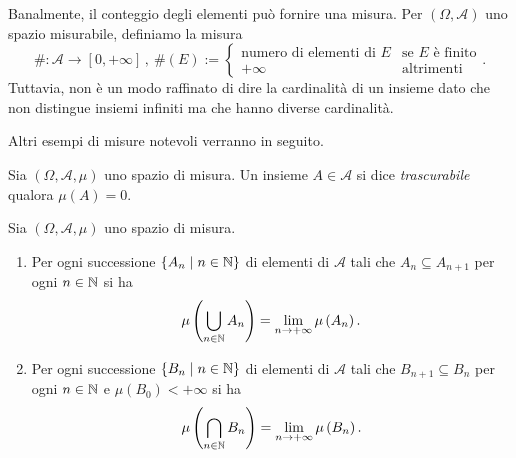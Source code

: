 \begin{esempio}
Banalmente, il conteggio degli elementi può fornire una misura. Per \((\Omega, \mathcal A)\) uno spazio misurabile, definiamo la misura
\[\# : \mathcal A \to [0, +\infty]\,, \ \#(E) := \begin{cases} \text{numero di elementi di } E & \text{se \(E\) è finito} \\ +\infty & \text{altrimenti} \end{cases} .\]
Tuttavia, non è un modo raffinato di dire la cardinalità di un insieme dato che non distingue insiemi infiniti ma che hanno diverse cardinalità.
\end{esempio}

Altri esempi di misure notevoli verranno in seguito.

\begin{definizione}
Sia \((\Omega, \mathcal A, \mu)\) uno spazio di misura. Un insieme \(A \in \mathcal A\) si dice {\em trascurabile}  qualora \(\mu(A) = 0\).
\end{definizione}

\begin{lemma}
Sia \((\Omega, \mathcal A, \mu)\) uno spazio di misura.
\begin{enumerate}
\item Per ogni successione \(\left\{A_n \mid n \in \mathbb N\right\}\) di elementi di \(\mathcal A\) tali che \(A_n \subseteq A_{n+1}\) per ogni \(n \in \mathbb N\) si ha
\[\mu \left( \bigcup_{n \in \mathbb N} A_n \right) = \lim_{n \to +\infty} \mu\left(A_n\right) .\]
\item Per ogni successione \(\left\{B_n \mid n \in \mathbb N\right\}\) di elementi di \(\mathcal A\) tali che \(B_{n+1} \subseteq B_n\) per ogni \(n \in \mathbb N\) e \(\mu \left( B_0 \right) < +\infty\) si ha
\[\mu \left( \bigcap_{n \in \mathbb N} B_n \right) = \lim_{n \to +\infty} \mu \left( B_n \right) .\]
\end{enumerate}
\end{lemma}

